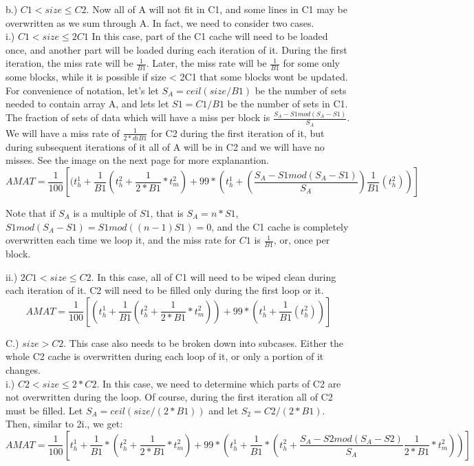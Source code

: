 \documentclass{article} %
\begin{document}
b.) $C1 < size \le C2.$ Now all of A will not fit in C1, and some lines in C1 may be overwritten as we sum through A. 
In fact, we need to consider two cases. \\
i.) $C1< size \le 2C1$
In this case, part of the C1 cache will need to be loaded once, and another part will be loaded during each iteration of it.  During the first iteration, the miss rate will be $\frac{1}{B1}$. Later, the miss rate will be $\frac{1}{B1}$ for some only some blocks, while it is possible if size < 2C1 that some blocks wont be updated. For convenience of notation, let's let $S_A =ceil(size/B1)$ be the number of sets needed to contain array A, and lets let $S1 = C1/B1$ be the number of sets in C1. The fraction of sets of data which will have a miss per block is $\frac{S_A - S1mod(S_A - S1)}{S_A}$. We will have a miss rate of $\frac1{2*diB1}$ for C2 during the first iteration of it, but during subsequent iterations of it all of A will be in C2 and we will have no misses. See the image on the next page for more explanantion.
\begin{equation}
AMAT = \frac{1}{100}[(t_h^1+\frac{1}{B1}(t_h^2 + \frac{1}{2*B1}*t_m^2) + 99*(t_h^1+(\frac{S_A - S1mod(S_A - S1)}{S_A})\frac{1}{B1}(t_h^2))]
\end{equation}

Note that if $S_A$ is a multiple of $S1$, that is $S_A = n*S1$, $S1mod(S_A-S1) = S1mod((n-1)S1) = 0$, and the C1 cache is completely overwritten each time we loop it, and the miss rate for $C1$ is $\frac1{B1}$, or, once per block.

ii.) $2C1 < size \le C2$. In this case, all of C1 will need to be wiped clean during each iteration of it. C2 will need to be filled only during the first loop  or it.
\begin{equation}
AMAT = \frac1{100}[(t_h^1+\frac{1}{B1}(t_h^2 + \frac{1}{2*B1}*t_m^2)) + 99*(t_h^1 + \frac{1}{B1}(t_h^2))]
\end{equation}


C.) $size > C2$.
This case also needs to be broken down into subcases. Either the whole C2 cache is overwritten during each loop of it, or only a portion of it changes.\\ 
i.) $C2 < size \le 2*C2$.
In this case, we need to determine which parts of C2 are not overwritten during the loop. Of course, during the first iteration all of C2 must be filled. Let $S_A = ceil(size/(2*B1))$ and let $S_2 = C2/(2*B1)$. Then, similar to 2i., we get:
\begin{equation}
AMAT = \frac1{100}[t_h^1 + \frac{1}{B1}*(t_h^2+\frac{1}{2*B1}* t_m^2)+99*(t_h^1 + \frac{1}{B1}*(t_h^2+\frac{S_A - S2mod(S_A - S2)}{S_A}\frac{1}{2*B1}* t_m^2))]
\end{equation}
\end{document}
